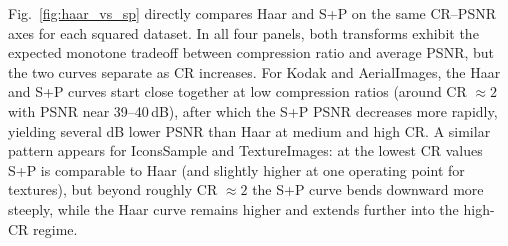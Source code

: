 Fig.~\ref{fig:haar_vs_sp} directly compares Haar and S+P on the same CR--PSNR
axes for each squared dataset. In all four panels, both transforms exhibit the
expected monotone tradeoff between compression ratio and average PSNR, but the
two curves separate as CR increases. For Kodak and AerialImages, the Haar and
S+P curves start close together at low compression ratios (around CR
$\approx 2$ with PSNR near 39–40\,dB), after which the S+P PSNR decreases more
rapidly, yielding several dB lower PSNR than Haar at medium and high CR. A
similar pattern appears for IconsSample and TextureImages: at the lowest CR
values S+P is comparable to Haar (and slightly higher at one operating point
for textures), but beyond roughly CR $\approx 2$ the S+P curve bends downward
more steeply, while the Haar curve remains higher and extends further into the
high-CR regime.


